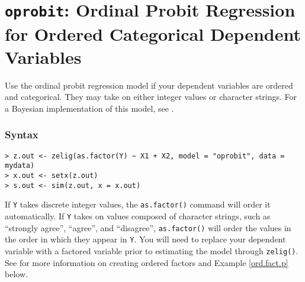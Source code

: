 \section{{\tt oprobit}: Ordinal Probit Regression for Ordered
Categorical Dependent Variables}\label{oprobit}

Use the ordinal probit regression model if your dependent variables
are ordered and categorical.  They may take on either integer values
or character strings.  For a Bayesian implementation of this model,
see .  

\subsubsection{Syntax}

\begin{verbatim}
> z.out <- zelig(as.factor(Y) ~ X1 + X2, model = "oprobit", data = mydata)
> x.out <- setx(z.out)
> s.out <- sim(z.out, x = x.out)
\end{verbatim}
If {\tt Y} takes discrete integer values, the {\tt as.factor()}
command will order it automatically.  If {\tt Y} takes on values
composed of character strings, such as ``strongly agree'', ``agree'',
and ``disagree'', {\tt as.factor()} will order the values in the order
in which they appear in {\tt Y}.  You will need to replace your
dependent variable with a factored variable prior to estimating the
model through {\tt zelig()}.  See  for more information
on creating ordered factors and Example \ref{ord.fact.p} below.

